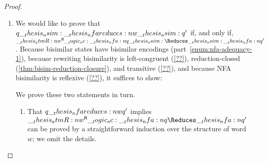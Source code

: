 \begin{proof}
\begin{enumerate}[parsep=0em, listparindent=\parindent]
\begin{itemize}[parsep=0em, listparindent=\parindent]
      
    \end{itemize}

      

  \item
    We would like to prove that $q \asim\nfareduces[w]\asim q'$ if, and only if, $\rev{\atmR{w}} \oc \nfa{q} \osim\Reduces\osim \nfa{q}'$.
    Because bisimilar states have bisimilar encodings (part~\ref{enum:nfa-adequacy-1}), because rewriting bisimilarity is left-congruent (\cref{??}), reduction-closed (\cref{thm:bisim-reduction-closure}), and transitive (\cref{??}), and because \ac{NFA} bisimilarity is reflexive (\cref{??}), it suffices to show:
    We prove these two statements in turn.
    \begin{enumerate}
    \item
      That $q \nfareduces[w] q'$ implies $\rev{\atmR{w}} \oc \nfa{q} \Reduces \nfa{q}'$ can be proved by a straightforward induction over the structure of word $w$;
      we omit the details.


\end{enumerate}
\end{enumerate}
\end{proof}
